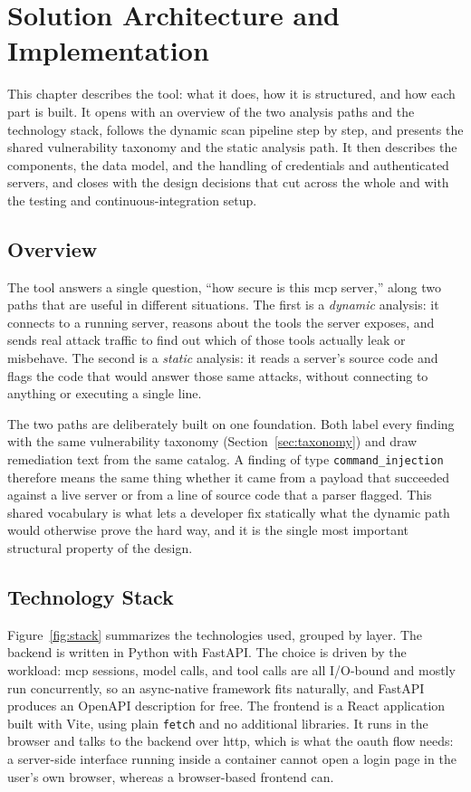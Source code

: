 \chapter{Solution Architecture and Implementation}
\label{chap:architecture}
\label{chap:implementation}

This chapter describes the tool: what it does, how it is structured, and how each part is built. It opens with an overview of the two analysis paths and the technology stack, follows the dynamic scan pipeline step by step, and presents the shared vulnerability taxonomy and the static analysis path. It then describes the components, the data model, and the handling of credentials and authenticated servers, and closes with the design decisions that cut across the whole and with the testing and continuous-integration setup.

\section{Overview}
\label{sec:overview}

The tool answers a single question, ``how secure is this \gls{mcp} server,'' along two paths that are useful in different situations. The first is a \emph{dynamic} analysis: it connects to a running server, reasons about the tools the server exposes, and sends real attack traffic to find out which of those tools actually leak or misbehave. The second is a \emph{static} analysis: it reads a server's source code and flags the code that would answer those same attacks, without connecting to anything or executing a single line.

The two paths are deliberately built on one foundation. Both label every finding with the same vulnerability taxonomy (Section~\ref{sec:taxonomy}) and draw remediation text from the same catalog. A finding of type \texttt{command\_injection} therefore means the same thing whether it came from a payload that succeeded against a live server or from a line of source code that a parser flagged. This shared vocabulary is what lets a developer fix statically what the dynamic path would otherwise prove the hard way, and it is the single most important structural property of the design.

\section{Technology Stack}
\label{sec:stack}

Figure~\ref{fig:stack} summarizes the technologies used, grouped by layer. The backend is written in Python with FastAPI. The choice is driven by the workload: \gls{mcp} sessions, model calls, and tool calls are all I/O-bound and mostly run concurrently, so an async-native framework fits naturally, and FastAPI produces an OpenAPI description for free. The frontend is a React application built with Vite, using plain \texttt{fetch} and no additional libraries. It runs in the browser and talks to the backend over \gls{http}, which is what the \gls{oauth} flow needs: a server-side interface running inside a container cannot open a login page in the user's own browser, whereas a browser-based frontend can.

